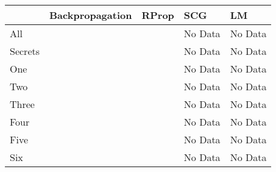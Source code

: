 \begin{tabular}{ l | l | l | l | l }
 & Backpropagation & RProp & SCG & LM \\
\hline
All & 
&  & No Data & No Data \\
\hline
Secrets & 
&  & No Data & No Data \\
\hline
One & 
&  & No Data & No Data \\
\hline
Two & 
&  & No Data & No Data \\
\hline
Three & 
&  & No Data & No Data \\
\hline
Four & 
&  & No Data & No Data \\
\hline
Five & 
&  & No Data & No Data \\
\hline
Six & 
&  & No Data & No Data \\
\hline
\end{tabular}
